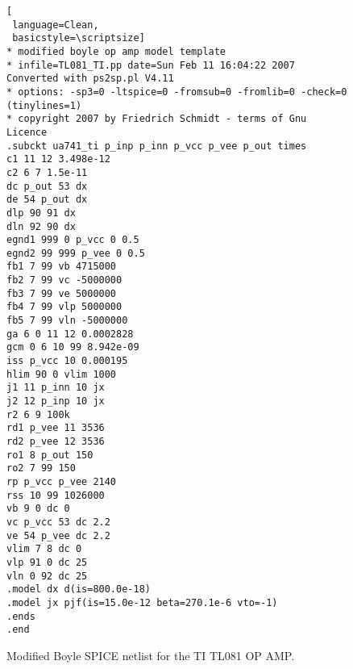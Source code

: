 \begin{figure} 
  \centering
\begin{lstlisting}[
 language=Clean, 
 basicstyle=\scriptsize]
* modified boyle op amp model template
* infile=TL081_TI.pp date=Sun Feb 11 16:04:22 2007 Converted with ps2sp.pl V4.11
* options: -sp3=0 -ltspice=0 -fromsub=0 -fromlib=0 -check=0 (tinylines=1)
* copyright 2007 by Friedrich Schmidt - terms of Gnu Licence
.subckt ua741_ti p_inp p_inn p_vcc p_vee p_out times
c1 11 12 3.498e-12
c2 6 7 1.5e-11
dc p_out 53 dx
de 54 p_out dx
dlp 90 91 dx
dln 92 90 dx
egnd1 999 0 p_vcc 0 0.5
egnd2 99 999 p_vee 0 0.5
fb1 7 99 vb 4715000
fb2 7 99 vc -5000000
fb3 7 99 ve 5000000
fb4 7 99 vlp 5000000
fb5 7 99 vln -5000000
ga 6 0 11 12 0.0002828
gcm 0 6 10 99 8.942e-09
iss p_vcc 10 0.000195
hlim 90 0 vlim 1000
j1 11 p_inn 10 jx
j2 12 p_inp 10 jx
r2 6 9 100k
rd1 p_vee 11 3536
rd2 p_vee 12 3536
ro1 8 p_out 150
ro2 7 99 150
rp p_vcc p_vee 2140
rss 10 99 1026000
vb 9 0 dc 0
vc p_vcc 53 dc 2.2
ve 54 p_vee dc 2.2
vlim 7 8 dc 0
vlp 91 0 dc 25
vln 0 92 dc 25
.model dx d(is=800.0e-18)
.model jx pjf(is=15.0e-12 beta=270.1e-6 vto=-1)
.ends
.end
\end{lstlisting}
  \caption{Modified Boyle SPICE netlist for the TI TL081 OP AMP. } 
  \label{fig:opamp54}
\end{figure}


